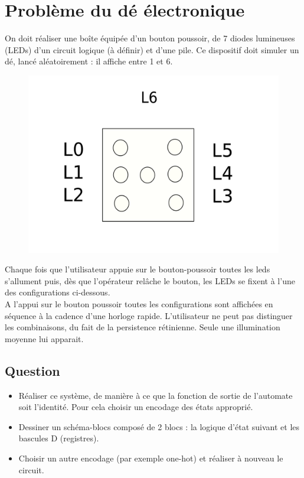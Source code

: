 \documentclass[a4paper,11pt]{article}
\begin{document}
\newpage
\section{Problème du dé électronique}
On doit réaliser une boîte équipée d'un bouton poussoir, de 7 diodes lumineuses (LEDs) d'un circuit logique (à définir) et d'une pile. Ce dispositif doit simuler un dé, lancé aléatoirement : il affiche entre 1 et 6.\\

\begin{figure}[!h]
\begin{center}
\includegraphics[scale=0.2]{./de-1.png}
\end{center}
\end{figure}


Chaque fois que l'utilisateur appuie sur le bouton-poussoir toutes les leds s'allument puis, dès que l'opérateur relâche le bouton, les LEDs se fixent à l'une des configurations ci-dessous.\\

A l'appui sur le bouton poussoir toutes les configurations sont affichées en séquence à la cadence d'une horloge rapide. L'utilisateur ne peut pas distinguer les combinaisons, du fait de la persistence rétinienne. Seule une illumination moyenne lui apparait.

\subsection*{Question}
\begin{itemize}
\item Réaliser ce système, de manière à ce que la fonction de sortie de l'automate soit l'identité. Pour cela choisir un encodage des états approprié.
\item Dessiner un schéma-blocs composé de 2 blocs : la logique d'état suivant et les bascules D (registres).
\item Choisir un autre encodage (par exemple one-hot) et réaliser à nouveau le circuit.
\end{itemize}
\end{document}
